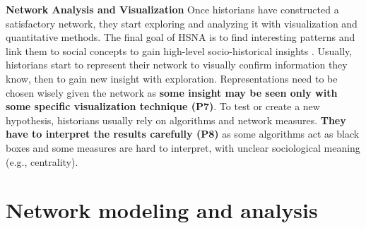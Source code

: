\noindent\textbf{Network Analysis and Visualization}
Once historians have constructed a satisfactory network, they start exploring and analyzing it with visualization and quantitative methods. The final goal of HSNA is to find interesting patterns and link them to social concepts to gain high-level socio-historical insights \cite{freeman_development_2004}.
Usually, historians start to represent their network to visually confirm information they know, then to gain new insight with exploration. Representations need to be chosen wisely given the network as \textbf{some insight may be seen only with some specific visualization technique (P7)}. To test or create a new hypothesis, historians usually rely on algorithms and network measures. \textbf{They have to interpret the results carefully (P8)} as some algorithms act as black boxes and some measures are hard to interpret, with unclear sociological meaning (e.g., centrality).


\section{Network modeling and analysis}\label{sec:modeling}


